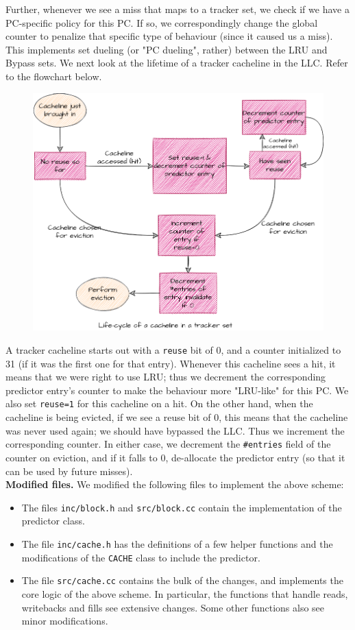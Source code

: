 \documentclass[11pt, swedish, openany]{book}
\begin{document}
Further, whenever we see a miss that maps to a tracker set, we check if we have a PC-specific policy for this PC. If so, we correspondingly change the global counter to penalize that specific type of behaviour (since it caused us a miss). This implements set dueling (or "PC dueling", rather) between the LRU and Bypass sets.
We next look at the lifetime of a tracker cacheline in the LLC. Refer to the flowchart below.
\begin{figure}[H]
    \centering
    \includegraphics[width=0.8\linewidth]{images/lifecycle.png}
\end{figure}
A tracker cacheline starts out with a \texttt{reuse} bit of 0, and a counter initialized to 31 (if it was the first one for that entry). Whenever this cacheline sees a hit, it means that we were right to use LRU; thus we decrement the corresponding predictor entry's counter to make the behaviour more "LRU-like" for this PC. We also set \texttt{reuse=1} for this cacheline on a hit. On the other hand, when the cacheline is being evicted, if we see a reuse bit of 0, this means that the cacheline was never used again; we should have bypassed the LLC. Thus we increment the corresponding counter. In either case, we decrement the \texttt{\#entries} field of the counter on eviction, and if it falls to 0, de-allocate the predictor entry (so that it can be used by future misses).\\
\textbf{Modified files.} We modified the following files to implement the above scheme:
\begin{itemize}
    \item The files \texttt{inc/block.h} and \texttt{src/block.cc} contain the implementation of the predictor class.
    \item The file \texttt{inc/cache.h} has the definitions of a few helper functions and the modifications of the \texttt{CACHE} class to include the predictor.
    \item The file \texttt{src/cache.cc} contains the bulk of the changes, and implements the core logic of the above scheme. In particular, the functions that handle reads, writebacks and fills see extensive changes. Some other functions also see minor modifications.
\end{itemize}
\end{document}
